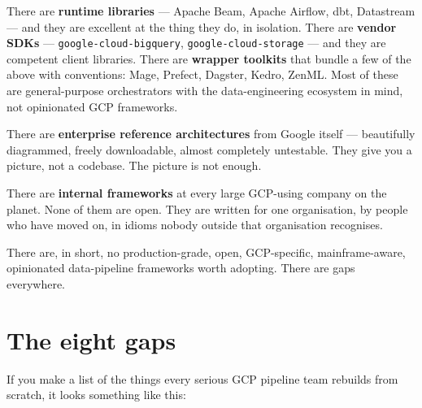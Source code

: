 \documentclass[
  11pt,
  british,
  oneside]{book}
\begin{document}
There are \textbf{runtime libraries} --- Apache Beam, Apache Airflow,
dbt, Datastream --- and they are excellent at the thing they do, in
isolation. There are \textbf{vendor SDKs} ---
\texttt{google-cloud-bigquery}, \texttt{google-cloud-storage} --- and
they are competent client libraries. There are \textbf{wrapper toolkits}
that bundle a few of the above with conventions: Mage, Prefect, Dagster,
Kedro, ZenML. Most of these are general-purpose orchestrators with the
data-engineering ecosystem in mind, not opinionated GCP frameworks.

There are \textbf{enterprise reference architectures} from Google itself
--- beautifully diagrammed, freely downloadable, almost completely
untestable. They give you a picture, not a codebase. The picture is not
enough.

There are \textbf{internal frameworks} at every large GCP-using company
on the planet. None of them are open. They are written for one
organisation, by people who have moved on, in idioms nobody outside that
organisation recognises.

There are, in short, no production-grade, open, GCP-specific,
mainframe-aware, opinionated data-pipeline frameworks worth adopting.
There are gaps everywhere.

\hypertarget{the-eight-gaps}{%
\section{The eight gaps}\label{the-eight-gaps}}

If you make a list of the things every serious GCP pipeline team
rebuilds from scratch, it looks something like this:
\end{document}
